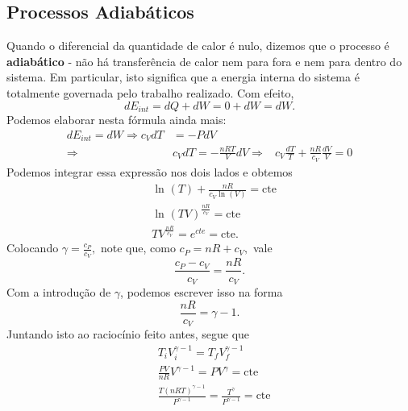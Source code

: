 \documentclass[PhysicsII/phsyicsII_notes.tex]{subfiles}
\begin{document}
\subsection{Processos Adiabáticos}
Quando o diferencial da quantidade de calor é nulo, dizemos que o processo é \textbf{adiabático} - não há transferência
de calor nem para fora e nem para dentro do sistema. Em particular, isto significa que a energia interna do sistema é totalmente
governada pelo trabalho realizado. Com efeito,
\[
	dE_{int} = dQ + dW = 0 + dW = dW.
\]
Podemos elaborar nesta fórmula ainda mais:
\begin{align*}
	dE_{int} = dW \Rightarrow c_{V}dT & = - PdV                                              \\
	\Rightarrow                       & c_{V}dT = -\frac{nRT}{V}dV
	\Rightarrow                       & c_{V}\frac{dT}{T} + \frac{nR}{c_{V}}\frac{dV}{V} = 0
\end{align*}
Podemos integrar essa expressão nos dois lados e obtemos
\begin{align*}
	 & \ln^{}{(T)} + \frac{nR}{c_{V}\ln^{}{(V)}} = \mathrm{cte} \\
	 & \ln^{}{(TV)^{\frac{nR}{c_{V}}}} = \mathrm{cte}           \\
	 & TV^{\frac{nR}{c_{V}}} = e^{cte} = \mathrm{cte}.
\end{align*}
Colocando \(\gamma  = \frac{c_{P}}{c_{V}},\) note que, como \(c_{P} = nR + c_{V},\) vale
\[
	\frac{c_{P}-c_{V}}{c_{V}} = \frac{nR}{c_{V}}.
\]
Com a introdução de \(\gamma \), podemos escrever isso na forma
\[
	\frac{nR}{c_{V}} = \gamma - 1.
\]
Juntando isto ao raciocínio feito antes, segue que
\begin{align*}
	 & T_{i}V_{i}^{\gamma - 1} = T_{f}V_{f}^{\gamma - 1}                                              \\
	 & \frac{PV}{nR}V^{\gamma - 1} = PV^{\gamma } = \mathrm{cte}                                      \\
	 & \frac{T(nRT)^{\gamma - 1}}{P^{\gamma - 1}} = \frac{T^{\gamma }}{P^{\gamma - 1}} = \mathrm{cte}
\end{align*}
\end{document}
